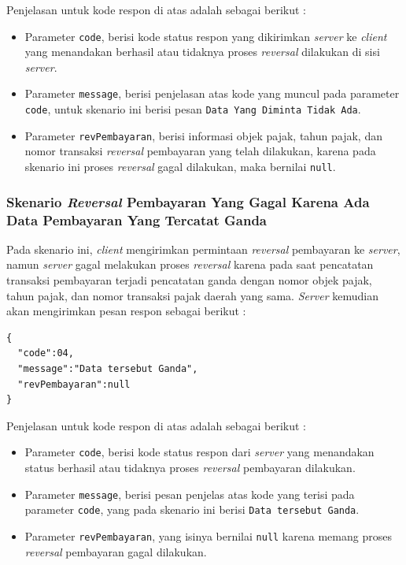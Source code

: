 \documentclass[pdftex,12pt, oneside]{article}
\begin{document}
  Penjelasan untuk kode respon di atas adalah sebagai berikut :
  
  \begin{itemize}
    \item Parameter \texttt{code}, berisi kode status respon yang dikirimkan \textit{server} ke \textit{client} yang menandakan berhasil atau tidaknya proses \textit{reversal} dilakukan di sisi \textit{server}.
    \item Parameter \texttt{message}, berisi penjelasan atas kode yang muncul pada parameter \texttt{code}, untuk skenario ini berisi pesan \texttt{Data Yang Diminta Tidak Ada}.
    \item Parameter \texttt{revPembayaran}, berisi informasi objek pajak, tahun pajak, dan nomor transaksi \textit{reversal} pembayaran yang telah dilakukan, karena pada skenario ini proses \textit{reversal} gagal dilakukan, maka bernilai \texttt{null}.
  \end{itemize}
  
  \subsubsection{Skenario \textit{Reversal} Pembayaran Yang Gagal Karena Ada Data Pembayaran Yang Tercatat Ganda}
  
  Pada skenario ini, \textit{client} mengirimkan permintaan \textit{reversal} pembayaran ke \textit{server}, namun \textit{server} gagal melakukan proses \textit{reversal} karena pada saat pencatatan transaksi pembayaran terjadi pencatatan ganda dengan nomor objek pajak, tahun pajak, dan nomor transaksi pajak daerah yang sama. \textit{Server} kemudian akan mengirimkan pesan respon sebagai berikut :
  
  \begin{lstlisting}
{
  "code":04,
  "message":"Data tersebut Ganda",
  "revPembayaran":null
}
  \end{lstlisting}
  
  Penjelasan untuk kode respon di atas adalah sebagai berikut :
  
  \begin{itemize}
    \item Parameter \texttt{code}, berisi kode status respon dari \textit{server} yang menandakan status berhasil atau tidaknya proses \textit{reversal} pembayaran dilakukan.
    \item Parameter \texttt{message}, berisi pesan penjelas atas kode yang terisi pada parameter \texttt{code}, yang pada skenario ini berisi \texttt{Data tersebut Ganda}.
    \item Parameter \texttt{revPembayaran}, yang isinya bernilai \texttt{null} karena memang proses \textit{reversal} pembayaran gagal dilakukan.
  \end{itemize}
  
\end{document}
